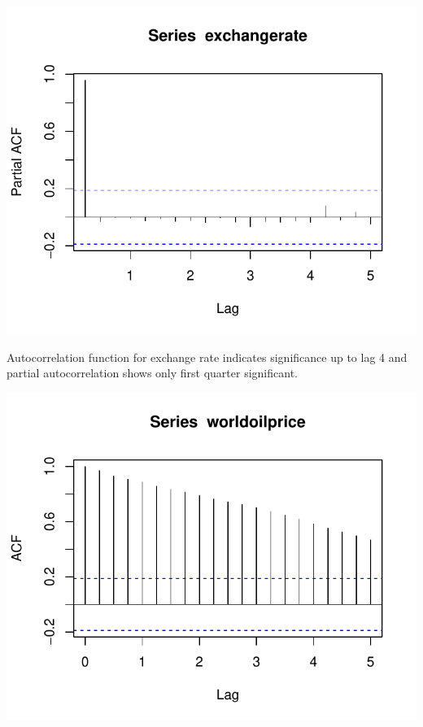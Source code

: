 \documentclass[11pt,preprint, authoryear]{elsarticle}
\numberwithin{equation}{section}
\numberwithin{figure}{section}
\numberwithin{table}{section}
\begin{document}
\begin{center}\includegraphics{README_files/figure-latex/unnamed-chunk-33-2} \end{center}

Autocorrelation function for exchange rate indicates significance up to
lag 4 and partial autocorrelation shows only first quarter significant.

\begin{center}\includegraphics{README_files/figure-latex/unnamed-chunk-34-1} \end{center}
\end{document}
